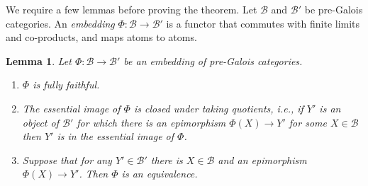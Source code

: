 \documentclass[12pt]{amsart}
\numberwithin{equation}{section}
\newtheorem{lemma}[equation]{Lemma}
\theoremstyle{definition}
\newcommand{\cB}{\mathcal{B}}
\newcommand{\defn}[1]{\emph{#1}}
\begin{document}
We require a few lemmas before proving the theorem. Let $\cB$ and $\cB'$ be pre-Galois categories. An \defn{embedding} $\Phi \colon \cB \to \cB'$ is a functor that commutes with finite limits and co-products, and maps atoms to atoms.

\begin{lemma} \label{lem:uncountable-1}
Let $\Phi \colon \cB \to \cB'$ be an embedding of pre-Galois categories.
\begin{enumerate}
\item $\Phi$ is fully faithful.
\item The essential image of $\Phi$ is closed under taking quotients, i.e., if $Y'$ is an object of $\cB'$ for which there is an epimorphism $\Phi(X) \to Y'$ for some $X \in \cB$ then $Y'$ is in the essential image of $\Phi$.
\item Suppose that for any $Y' \in \cB'$ there is $X \in \cB$ and an epimorphism $\Phi(X) \to Y'$. Then $\Phi$ is an equivalence.
\end{enumerate}
\end{lemma}
\end{document}
